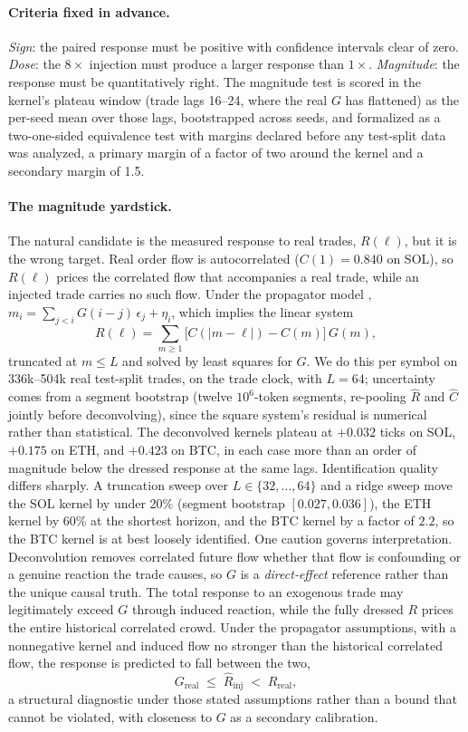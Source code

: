 \documentclass[sigconf,anonymous]{acmart}
\begin{document}
\paragraph{Criteria fixed in advance.} \emph{Sign}: the paired response must be positive with confidence intervals clear of zero. \emph{Dose}: the $8\times$ injection must produce a larger response than $1\times$. \emph{Magnitude}: the response must be quantitatively right. The magnitude test is scored in the kernel's plateau window (trade lags 16--24, where the real $G$ has flattened) as the per-seed mean over those lags, bootstrapped across seeds, and formalized as a two-one-sided equivalence test with margins declared before any test-split data was analyzed, a primary margin of a factor of two around the kernel and a secondary margin of 1.5.

\paragraph{The magnitude yardstick.} The natural candidate is the measured response to real trades, $R(\ell)$, but it is the wrong target. Real order flow is autocorrelated ($C(1)=0.840$ on SOL), so $R(\ell)$ prices the correlated flow that accompanies a real trade, while an injected trade carries no such flow. Under the propagator model \citep{bouchaud2004,taranto2016}, $m_i = \sum_{j<i} G(i-j)\,\epsilon_j + \eta_i$, which implies the linear system
\[
R(\ell) = \sum_{m\ge 1}\big[C(|m-\ell|)-C(m)\big]\,G(m),
\]
truncated at $m \le L$ and solved by least squares for $G$. We do this per symbol on 336k--504k real test-split trades, on the trade clock, with $L=64$; uncertainty comes from a segment bootstrap (twelve $10^6$-token segments, re-pooling $\hat R$ and $\hat C$ jointly before deconvolving), since the square system's residual is numerical rather than statistical. The deconvolved kernels plateau at $+0.032$ ticks on SOL, $+0.175$ on ETH, and $+0.423$ on BTC, in each case more than an order of magnitude below the dressed response at the same lags. Identification quality differs sharply. A truncation sweep over $L \in \{32,\dots,64\}$ and a ridge sweep move the SOL kernel by under 20\% (segment bootstrap $[0.027, 0.036]$), the ETH kernel by 60\% at the shortest horizon, and the BTC kernel by a factor of $2.2$, so the BTC kernel is at best loosely identified. One caution governs interpretation. Deconvolution removes correlated future flow whether that flow is confounding or a genuine reaction the trade causes, so $G$ is a \emph{direct-effect} reference rather than the unique causal truth. The total response to an exogenous trade may legitimately exceed $G$ through induced reaction, while the fully dressed $R$ prices the entire historical correlated crowd. Under the propagator assumptions, with a nonnegative kernel and induced flow no stronger than the historical correlated flow, the response is predicted to fall between the two,
\[
G_{\mathrm{real}} \;\le\; \hat{R}_{\mathrm{inj}} \;<\; R_{\mathrm{real}},
\]
a structural diagnostic under those stated assumptions rather than a bound that cannot be violated, with closeness to $G$ as a secondary calibration.
\end{document}
